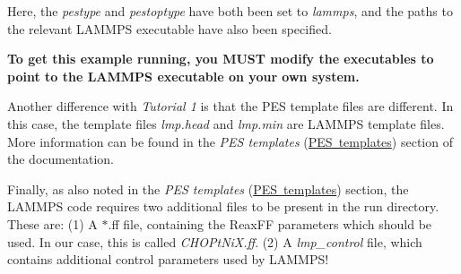 \begin{DoxyItemize}
\item Here, the {\itshape pestype} and {\itshape pestoptype} have both been set to {\itshape lammps}, and the paths to the relevant L\+A\+M\+M\+PS executable have also been specified.
\item {\bfseries To get this example running, you M\+U\+ST modify the executables to point to the L\+A\+M\+M\+PS executable on your own system.}
\item Another difference with {\itshape Tutorial 1} is that the P\+ES template files are different. In this case, the template files {\itshape lmp.\+head} and {\itshape lmp.\+min} are L\+A\+M\+M\+PS template files. More information can be found in the {\itshape P\+ES templates} (\mbox{\hyperlink{_templates}{P\+ES templates}}) section of the documentation.
\item Finally, as also noted in the {\itshape P\+ES templates} (\mbox{\hyperlink{_templates}{P\+ES templates}}) section, the L\+A\+M\+M\+PS code requires two additional files to be present in the run directory. These are\+: (1) A $\ast$.ff file, containing the Reax\+FF parameters which should be used. In our case, this is called {\itshape C\+H\+O\+Pt\+Ni\+X.\+ff}. (2) A {\itshape lmp\+\_\+control} file, which contains additional control parameters used by L\+A\+M\+M\+P\+S! 
\end{DoxyItemize}
